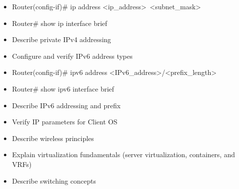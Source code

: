 \documentclass{article}
\begin{document}
\begin{itemize}
  	\item[] Router(config-if)\# ip address \textless ip\_address\textgreater\ \textless subnet\_mask\textgreater
  	\item[] Router\# show ip interface brief\\
  \item Describe private IPv4 addressing
  \item Configure and verify IPv6 address types
  	\item[] Router(config-if)\# ipv6 address \textless IPv6\_address\textgreater/\textless prefix\_length\textgreater
  	\item[] Router\# show ipv6 interface brief\\
  \item Describe IPv6 addressing and prefix
  \item Verify IP parameters for Client OS
  \item Describe wireless principles
  \item Explain virtualization fundamentals (server virtualization, containers, and VRFs)
  \item Describe switching concepts\\
\end{itemize}
\end{document}
